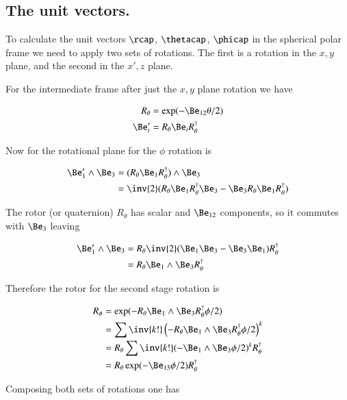 \subsection{The unit vectors. }

To calculate the unit vectors $\rcap$, $\thetacap$, $\phicap$ in the spherical polar frame we need to apply two sets of rotations.  The first is a rotation 
in the $x,y$ plane, and the second in the $x', z$ plane.

For the intermediate frame after just the $x,y$ plane rotation we have

\begin{align*}
R_\theta &= \exp(-\Be_{12}\theta/2) \\
\Be_i' &= R_\theta \Be_i R_\theta^\dagger
\end{align*}

Now for the rotational plane for the $\phi$ rotation is

\begin{align*}
\Be_1' \wedge \Be_3 
&= (R_\theta \Be_1 R_\theta^\dagger) \wedge \Be_3 \\
&= \inv{2} ( R_\theta \Be_1 R_\theta^\dagger \Be_3 - \Be_3 R_\theta \Be_1 R_\theta^\dagger ) \\
\end{align*}

The rotor (or quaternion) $R_\theta$ has scalar and $\Be_{12}$ components, so it commutes with $\Be_3$ leaving

\begin{align*}
\Be_1' \wedge \Be_3 
&= R_\theta \inv{2} ( \Be_1 \Be_3 - \Be_3 \Be_1 ) R_\theta^\dagger \\
&= R_\theta \Be_1 \wedge \Be_3 R_\theta^\dagger \\
\end{align*}

Therefore the rotor for the second stage rotation is

\begin{align*}
R_\phi 
&= \exp( - R_\theta \Be_1 \wedge \Be_3 R_\theta^\dagger \phi/2 ) \\
&= \sum \inv{k!} \left( - R_\theta \Be_1 \wedge \Be_3 R_\theta^\dagger \phi/2 \right)^k \\
&= R_\theta \sum \inv{k!} ( - \Be_1 \wedge \Be_3 \phi/2 )^k R_\theta^\dagger \\
&= R_\theta \exp( - \Be_{13} \phi/2 ) R_\theta^\dagger \\
\end{align*}

Composing both sets of rotations one has

